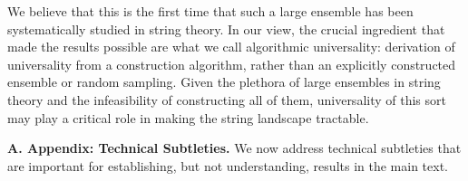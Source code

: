 \documentclass[aps,prl,twocolumn, superscriptaddress,groupedaddress,nofootinbib]{revtex4-1}
\newcommand{\XXX}[3]{}
\begin{document}
We believe that this is the first time that such a large ensemble has been systematically
studied in string theory. In our view, the crucial ingredient that made the results
possible are what we call algorithmic
universality: derivation of universality from a construction algorithm, rather than
an explicitly constructed ensemble or random sampling. Given the plethora of large ensembles in string theory
and the infeasibility of constructing all of them, universality of this sort may play
a critical role in making the string landscape tractable.


\XXX{cl}{jh}{Tightened the text a bit, and only removed ideas that we might not want
to let out of the bag.}

\vspace{.2cm}
\noindent \textbf{A. Appendix: Technical Subtleties.} We now
address technical subtleties that are important for establishing,
but not understanding, results in the main text.
\end{document}
